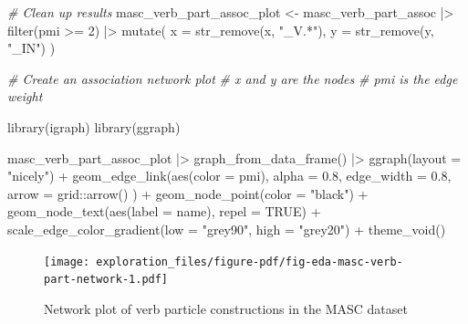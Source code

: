 \documentclass[
  letterpaper,
  DIV=11,
  numbers=noendperiod]{scrreport}
\newenvironment{Shaded}{\begin{snugshade}}{\end{snugshade}}
\newcommand{\AttributeTok}[1]{\textcolor[rgb]{0.00,0.00,0.00}{#1}}
\newcommand{\CommentTok}[1]{\textcolor[rgb]{0.00,0.00,0.00}{\textit{#1}}}
\newcommand{\ConstantTok}[1]{\textcolor[rgb]{0.00,0.00,0.00}{#1}}
\newcommand{\DecValTok}[1]{\textcolor[rgb]{0.00,0.00,0.00}{#1}}
\newcommand{\FloatTok}[1]{\textcolor[rgb]{0.00,0.00,0.00}{#1}}
\newcommand{\FunctionTok}[1]{\textcolor[rgb]{0.00,0.00,0.00}{#1}}
\newcommand{\NormalTok}[1]{\textcolor[rgb]{0.00,0.00,0.00}{#1}}
\newcommand{\OtherTok}[1]{\textcolor[rgb]{0.00,0.00,0.00}{#1}}
\newcommand{\SpecialCharTok}[1]{\textcolor[rgb]{0.00,0.00,0.00}{#1}}
\newcommand{\StringTok}[1]{\textcolor[rgb]{0.00,0.00,0.00}{#1}}
\theoremstyle{definition}
\theoremstyle{remark}
\begin{document}
\begin{Shaded}
\begin{Highlighting}[]
\CommentTok{\# Clean up results}
\NormalTok{masc\_verb\_part\_assoc\_plot }\OtherTok{\textless{}{-}}
\NormalTok{  masc\_verb\_part\_assoc }\SpecialCharTok{|\textgreater{}}
  \FunctionTok{filter}\NormalTok{(pmi }\SpecialCharTok{\textgreater{}=} \DecValTok{2}\NormalTok{) }\SpecialCharTok{|\textgreater{}}
  \FunctionTok{mutate}\NormalTok{(}
    \AttributeTok{x =} \FunctionTok{str\_remove}\NormalTok{(x, }\StringTok{"\_V.*"}\NormalTok{),}
    \AttributeTok{y =} \FunctionTok{str\_remove}\NormalTok{(y, }\StringTok{"\_IN"}\NormalTok{)}
\NormalTok{  )}

\CommentTok{\# Create an association network plot}
\CommentTok{\# \textasciigrave{}x\textasciigrave{} and \textasciigrave{}y\textasciigrave{} are the nodes}
\CommentTok{\# \textasciigrave{}pmi\textasciigrave{} is the edge weight}

\FunctionTok{library}\NormalTok{(igraph)}
\FunctionTok{library}\NormalTok{(ggraph)}

\NormalTok{masc\_verb\_part\_assoc\_plot }\SpecialCharTok{|\textgreater{}}
  \FunctionTok{graph\_from\_data\_frame}\NormalTok{() }\SpecialCharTok{|\textgreater{}}
  \FunctionTok{ggraph}\NormalTok{(}\AttributeTok{layout =} \StringTok{"nicely"}\NormalTok{) }\SpecialCharTok{+}
  \FunctionTok{geom\_edge\_link}\NormalTok{(}\FunctionTok{aes}\NormalTok{(}\AttributeTok{color =}\NormalTok{ pmi),}
    \AttributeTok{alpha =} \FloatTok{0.8}\NormalTok{,}
    \AttributeTok{edge\_width =} \FloatTok{0.8}\NormalTok{,}
    \AttributeTok{arrow =}\NormalTok{ grid}\SpecialCharTok{::}\FunctionTok{arrow}\NormalTok{()}
\NormalTok{  ) }\SpecialCharTok{+}
  \FunctionTok{geom\_node\_point}\NormalTok{(}\AttributeTok{color =} \StringTok{"black"}\NormalTok{) }\SpecialCharTok{+}
  \FunctionTok{geom\_node\_text}\NormalTok{(}\FunctionTok{aes}\NormalTok{(}\AttributeTok{label =}\NormalTok{ name), }\AttributeTok{repel =} \ConstantTok{TRUE}\NormalTok{) }\SpecialCharTok{+}
  \FunctionTok{scale\_edge\_color\_gradient}\NormalTok{(}\AttributeTok{low =} \StringTok{"grey90"}\NormalTok{, }\AttributeTok{high =} \StringTok{"grey20"}\NormalTok{) }\SpecialCharTok{+}
  \FunctionTok{theme\_void}\NormalTok{()}
\end{Highlighting}
\end{Shaded}

\begin{figure}[H]

{\centering \texttt{[image: exploration\_files/figure-pdf/fig-eda-masc-verb-part-network-1.pdf]}

}

\caption{\label{fig-eda-masc-verb-part-network}Network plot of verb
particle constructions in the MASC dataset}

\end{figure}
\end{document}
